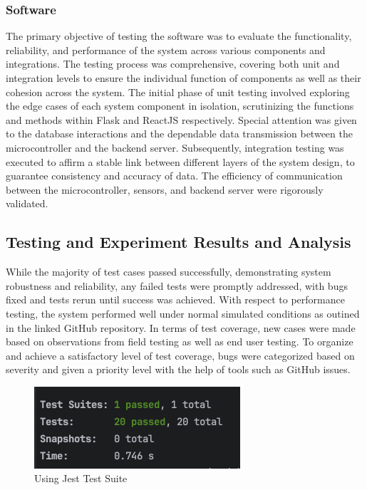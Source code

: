 \subsubsection{Software}

The primary objective of testing the software was to evaluate the functionality, reliability,
and performance of the system across various components and integrations. The testing process
was comprehensive, covering both unit and integration levels to ensure the individual
function of components as well as their cohesion across the system. The initial phase of unit
testing involved exploring the edge cases of each system component in isolation, scrutinizing
the functions and methods within Flask and ReactJS respectively. Special attention was given
to the database interactions and the dependable data transmission between the microcontroller
and the backend server. Subsequently, integration testing was executed to affirm a stable link
between different layers of the system design, to guarantee consistency and accuracy of data.
The efficiency of communication between the microcontroller, sensors, and backend server were
rigorously validated.

\subsection{Testing and Experiment Results and Analysis}\label{subsec:testing-and-experiment-results-and-analysis}

While the majority of test cases passed successfully, demonstrating system
robustness and reliability, any failed tests were promptly addressed,
with bugs fixed and tests rerun until success was achieved. With respect to performance testing, the system performed well under normal simulated conditions as outined in the linked GitHub repository. \cite{MorteSense-2023} In terms of test coverage, new cases were made based on observations from field testing as well as end user testing. To organize and achieve a satisfactory level of test coverage, bugs were categorized based on severity and given a priority level with the help of tools such as GitHub issues.

\begin{figure}[htbp]
      \centering
      \includegraphics[width=1\linewidth]{datasets/images/Jest-Test-Suite.png}
      \caption{Using Jest Test Suite}
      \label{fig:figure2}

\end{figure}

